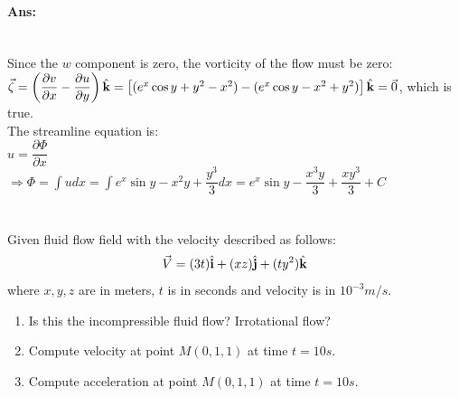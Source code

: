 \paragraph{Ans:}$  $\\
Since the $ w $ component is zero, the vorticity of the flow must be zero:\\
$ \vec{\zeta} = \left(\dfrac{\partial v}{\partial x} - \dfrac{\partial u}{\partial y}\right) \hat{\mathbf{k}} = \left[(e^x\cos y + y^2 - x^2 ) - (e^x\cos y - x^2 + y^2)\right] \hat{\mathbf{k}} = \vec{0}$, which is true.\\
The streamline equation is:\\
$ u=\dfrac{\partial \Phi}{\partial x} $\\
$\displaystyle \Rightarrow \Phi = \int u dx = \int e^x \sin y - x^2y + \dfrac{y^3}{3} dx = e^x \sin y - \dfrac{x^3y}{3} + \dfrac{xy^3}{3} + C $
\section{}
Given fluid flow field with the velocity described as follows:
\[\vec{V} = (3t)\hat{\mathbf{i}} + (xz)\hat{\mathbf{j}} + (ty^2)\hat{\mathbf{k}}\]
where $ x,y,z $ are in meters, $ t $ is in seconds and velocity is in $ 10^{-3}\unit{m/s} $.
\begin{enumerate}
	\item Is this the incompressible fluid flow? Irrotational flow?
	\item Compute velocity at point $ M(0,1,1) $ at time $ t=10\unit{s} $.
	\item Compute acceleration at point $ M(0,1,1) $ at time $ t=10\unit{s} $.
\end{enumerate}
